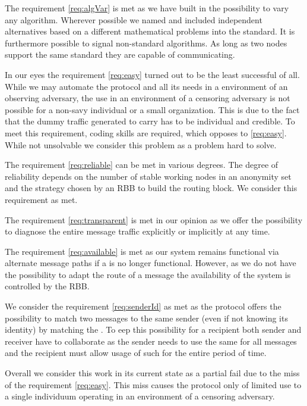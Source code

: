 The requirement \ref{req:algVar} is met as we have built in the possibility to vary any algorithm. Wherever possible we named and included independent alternatives based on a different mathematical problems into the standard. It is furthermore possible to signal non-standard algorithms. As long as two nodes support the same standard they are capable of communicating.

In our eyes the requirement \ref{req:easy} turned out to be the least successful of all. While we may automate the \MessageVortex{} protocol and all its needs in a environment of an observing adversary, the use in an environment of a censoring adversary is not possible for a non-savy individual or a small organization. This is due to the fact that the dummy traffic generated to carry \VortexMessages{} has to be individual and credible. To meet this requirement, coding skills are required, which opposes to \ref{req:easy}. While not unsolvable we consider this problem as a problem hard to solve.

The requirement \ref{req:reliable} can be met in various degrees. The degree of reliability depends on the number of stable working nodes in an anonymity set and the strategy chosen by an RBB to build the routing block. We consider this requirement as met. 

The requirement \ref{req:transparent} is met in our opinion as we offer the possibility to diagnose the entire message traffic explicitly or implicitly at any time. 

The requirement \ref{req:available} is met as our system remains functional via alternate message paths if a \VortexNode{} is no longer functional. However, as we do not have the possibility to adapt the route of a message the availability of the system is controlled by the RBB.

We consider the requirement \ref{req:senderId} as met as the protocol offers the possibility to match two messages to the same sender (even if not knowing its identity) by matching the . To eep this possibility for a recipient both sender and receiver have to collaborate as the sender needs to use the same  for all messages and the recipient must allow usage of such  for the entire period of time.

Overall we consider this work in its current state as a partial fail due to the miss of the requirement \ref{req:easy}. This miss causes the protocol only of limited use to a single individuum operating in an environment of a censoring adversary.

